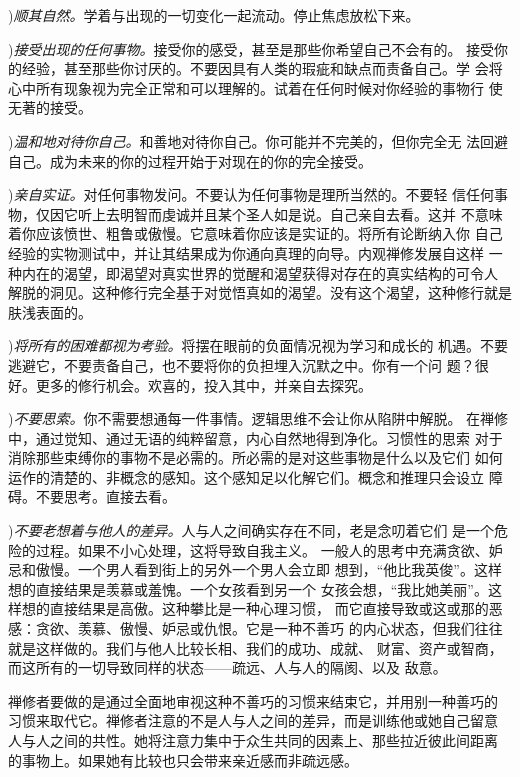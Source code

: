 ){\it 顺其自然。}学着与出现的一切变化一起流动。停止焦虑放松下来。


){\it 接受出现的任何事物。}接受你的感受，甚至是那些\1你希望自己不会有的。
接受你的经验，甚至那些你讨厌的。不要因具有人类的瑕疵和缺点而责备自己。学
会将心中所有现象视为完全正常和可以理解的。试着在任何时候对你经验的事物行
使无著的接受。

){\it 温和地对待你自己。}和善地对待你自己。你可能并不完美的，但你完全无
法回避自己。成为未来的你的过程开始于对现在的你的完全接受。

){\it 亲自实证。}对任何事物发问。不要认为任何事物是理所当然的。不要轻
信任何事物，仅因它听上去明智而虔诚并且某个圣人如是说。自己亲自去看。这并
不意味着你应该愤世、粗鲁或傲慢。它意味着你应该是实证的。将所有论断纳入你
自己经验的实物测试中，并让其结果成为你通向真理的向导。内观禅修发展自这样
一种内在的渴望，即渴望对真实世界的觉醒和渴望获得对存在的真实结构的可令人
解脱的洞见。这种修行完全基于对觉悟真如的渴望。没有这个渴望，这种修行就是
肤浅表面的。

){\it 将所有的困难都视为考验。}将摆在眼前的负面情况视为学习和成长的
机遇。不要逃避它，不要责备自己，也不要将你的负担埋入沉默之中。你有一个问
题？很好。更多的修行机会。欢喜的，投入其中，并亲自去探究。

){\it 不要思索。}你不需要想通每一件事情。逻辑思维不会让你从陷阱中解脱。
在禅修中，通过觉知、通过无语的纯粹留意，内心自然地得到净化。习惯性的思索
对于消除\1那些束缚你的事物不是必需的。所必需的是对这些事物是什么以及它们
如何运作的清楚的、非概念的感知。这个感知足以化解它们。概念和推理只会设立
障碍。不要思考。直接去看。

){\it 不要老想着与他人的差异。}人与人之间确实存在不同，老是念叨着它们
是一个危险的过程。如果不小心处理，这将导致自我主义。
一般人的思考中充满贪欲、妒忌和傲慢。一个男人看到街上的另外一个男人会立即
想到，“他比我英俊”。这样想的直接结果是羡慕或羞愧。一个女孩看到另一个
女孩会想，“我比她美丽”。这样想的直接结果是高傲。这种攀比是一种心理习惯，
而它直接导致或这或那的恶感：贪欲、羡慕、傲慢、妒忌或仇恨。它是一种不善巧
的内心状态，但我们往往就是这样做的。我们与他人比较长相、我们的成功、成就、
财富、资产或智商，而这所有的一切导致同样的状态——疏远、人与人的隔阂、以及
敌意。

禅修者要做的是通过全面地审视这种不善巧的习惯来结束它，并用别一种善巧的
习惯来取代它。禅修者注意的不是人与人之间的差异，而是训练他或她自己留意
人与人之间的共性。她将注意力集中于众生共同的因素上、那些拉近彼此间距离
的事物上。如果她有比较也只会带来亲近感而非疏远感。

